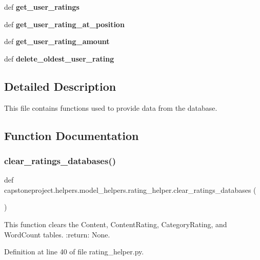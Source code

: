 \begin{DoxyCompactItemize}
def {\bfseries get\+\_\+user\+\_\+ratings}
\item 
\mbox{\label{namespacecapstoneproject_1_1helpers_1_1model__helpers_1_1rating__helper_ab3847602c80cdf0924f58942e5b32b9b}} 
def {\bfseries get\+\_\+user\+\_\+rating\+\_\+at\+\_\+position}
\item 
\mbox{\label{namespacecapstoneproject_1_1helpers_1_1model__helpers_1_1rating__helper_a2b7b630c727c72dd3841f8634c2f4f06}} 
def {\bfseries get\+\_\+user\+\_\+rating\+\_\+amount}
\item 
\mbox{\label{namespacecapstoneproject_1_1helpers_1_1model__helpers_1_1rating__helper_ad0c3c8827676e17d6944cf43a4b4d4e0}} 
def {\bfseries delete\+\_\+oldest\+\_\+user\+\_\+rating}
\end{DoxyCompactItemize}


\subsection{Detailed Description}
\begin{DoxyVerb}This file contains functions used to provide data from the database.
\end{DoxyVerb}
 

\subsection{Function Documentation}
\mbox{\label{namespacecapstoneproject_1_1helpers_1_1model__helpers_1_1rating__helper_a9c0e180a3be0ce11bd0ace717766f1ea}} 
\subsubsection{\texorpdfstring{clear\+\_\+ratings\+\_\+databases()}{clear\_ratings\_databases()}}
{\footnotesize\ttfamily def capstoneproject.\+helpers.\+model\+\_\+helpers.\+rating\+\_\+helper.\+clear\+\_\+ratings\+\_\+databases (\begin{DoxyParamCaption}{ }\end{DoxyParamCaption})}

\begin{DoxyVerb}This function clears the Content, ContentRating,
CategoryRating, and WordCount tables.
:return: None.
\end{DoxyVerb}
 

Definition at line 40 of file rating\+\_\+helper.\+py.

